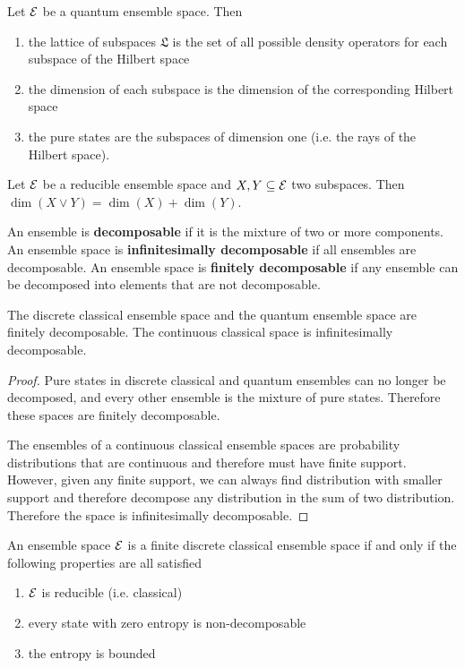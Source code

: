 \begin{conj}
	Let $\mathcal{E}$ be a quantum ensemble space. Then
	\begin{enumerate}
		\item the lattice of subspaces $\mathfrak{L}$ is the set of all possible density operators for each subspace of the Hilbert space
		\item the dimension of each subspace is the dimension of the corresponding Hilbert space
		\item the pure states are the subspaces of dimension one (i.e. the rays of the Hilbert space).
	\end{enumerate}
\end{conj}

\begin{conj}
	Let $\mathcal{E}$ be a reducible ensemble space and $X,Y \subseteq{\mathcal{E}}$ two subspaces. Then $\dim(X \vee Y) = \dim(X) + \dim(Y)$.
\end{conj}


\begin{defn}
	An ensemble is \textbf{decomposable} if it is the mixture of two or more components. An ensemble space is \textbf{infinitesimally decomposable} if all ensembles are decomposable. An ensemble space is \textbf{finitely decomposable} if any ensemble can be decomposed into elements that are not decomposable.
\end{defn}

\begin{prop}
	The discrete classical ensemble space and the quantum ensemble space are finitely decomposable. The continuous classical space is infinitesimally decomposable.
\end{prop}

\begin{proof}
	Pure states in discrete classical and quantum ensembles can no longer be decomposed, and every other ensemble is the mixture of pure states. Therefore these spaces are finitely decomposable.
	
	The ensembles of a continuous classical ensemble spaces are probability distributions that are continuous and therefore must have finite support. However, given any finite support, we can always find distribution with smaller support and therefore decompose any distribution in the sum of two distribution. Therefore the space is infinitesimally decomposable.
\end{proof}

\begin{conj}
	An ensemble space $\mathcal{E}$ is a finite discrete classical ensemble space if and only if the following properties are all satisfied
	\begin{enumerate}
		\item $\mathcal{E}$ is reducible (i.e. classical)
		\item every state with zero entropy is non-decomposable
		\item the entropy is bounded
	\end{enumerate}
\end{conj}

